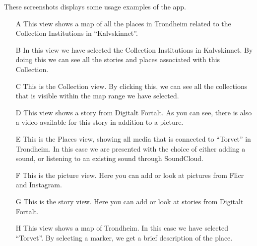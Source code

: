 \documentclass[12pt,a4paper,titlepage]{article}
\begin{document}
These screenshots displays some usage examples of the app.

\begin{itemize}
\item[A] This view shows a map of all the places in Trondheim related to the Collection Institutions in ``Kalvskinnet''.
\item[B] In this view we have selected the Collection Institutions in Kalvskinnet. By doing this we can see all the stories and places associated with this Collection.
\item[C] This is the Collection view. By clicking this, we can see all the collections that is visible within the map range we have selected.
\item[D] This view shows a story from Digitalt Fortalt. As you can see, there is also a video available for this story in addition to a picture.
\item[E] This is the Places view, showing all media that is connected to ``Torvet'' in Trondheim. In this case we are presented with the choice of either adding a sound, or listening to an existing sound through SoundCloud.
\item[F] This is the picture view. Here you can add or look at pictures from Flicr and Instagram.
\item[G] This is the story view. Here you can add or look at stories from Digitalt Fortalt.
\item[H] This view shows a map of Trondheim. In this case we have selected ``Torvet''. By selecting a marker, we get a brief description of the place.
\end{itemize}
\end{document}
